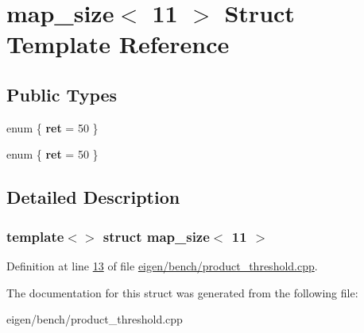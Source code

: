 \hypertarget{structmap__size_3_0111_01_4}{}\section{map\+\_\+size$<$ 11 $>$ Struct Template Reference}
\label{structmap__size_3_0111_01_4}
\subsection*{Public Types}
\begin{DoxyCompactItemize}
\item 
\mbox{\label{structmap__size_3_0111_01_4_a413fce7ecc61705899c93bd131a453db}} 
enum \{ {\bfseries ret} = 50
 \}
\item 
\mbox{\label{structmap__size_3_0111_01_4_a3258ac1198203e350d7acdbe1d876f9e}} 
enum \{ {\bfseries ret} = 50
 \}
\end{DoxyCompactItemize}


\subsection{Detailed Description}
\subsubsection*{template$<$$>$\newline
struct map\+\_\+size$<$ 11 $>$}



Definition at line \hyperlink{eigen_2bench_2product__threshold_8cpp_source_l00013}{13} of file \hyperlink{eigen_2bench_2product__threshold_8cpp_source}{eigen/bench/product\+\_\+threshold.\+cpp}.



The documentation for this struct was generated from the following file\+:\begin{DoxyCompactItemize}
\item 
eigen/bench/product\+\_\+threshold.\+cpp\end{DoxyCompactItemize}
